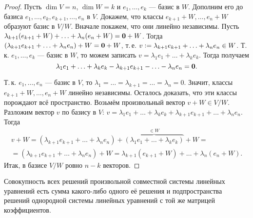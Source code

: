 \begin{proof}
    Пусть $\dim V = n$, $\dim W = k$ и $e_1, \ldots, e_k$ --- базис в $W$. Дополним его до базиса $e_1, \ldots, e_k, e_{k + 1}, \ldots, e_n$ в $V$. Докажем, что классы $e_{k + 1} + W, \ldots, e_n + W$ образуют базис в $V / W$. Вначале покажем, что они линейно независимы. Пусть $\lambda_{k + 1}(e_{k + 1} + W) + \ldots + \lambda_n(e_n + W) = \boldsymbol{0} + W$. Тогда $(\lambda_{k + 1}e_{k + 1} + \ldots + \lambda_ne_n) + W = \boldsymbol{0} + W$, т.\,е. $v \vcentcolon = \lambda_{k + 1}e_{k + 1} + \ldots + \lambda_ne_n \in W$. Т.\,к. $e_1, \ldots, e_k$ --- базис в $W$, то можем записать $v = \lambda_1e_1 + \ldots + \lambda_ke_k$. Тогда получаем
    \[
        \lambda_1e_1 + \ldots + \lambda_ke_k - \lambda_{k + 1}e_{k + 1} - \ldots - \lambda_ne_n = \boldsymbol{0}.
    \]

    Т.\,к. $e_1, \ldots, e_n$ --- базис в $V$, то $\lambda_1 = \ldots = \lambda_{k + 1} = \ldots = \lambda_n = 0$. Значит, классы $e_{k + 1} + W, \ldots, e_n + W$ линейно независимы. Осталось доказать, что эти классы порождают всё пространство. Возьмём произвольный вектор $v + W \in V / W$. Разложим вектор $v$ по базису в $V$: $v = \lambda_1e_1 + \ldots + \lambda_ke_k + \lambda_{k + 1}e_{k + 1} + \ldots + \lambda_ne_n$. Тогда
    \begin{multline*}
        v + W = (\lambda_{k + 1}e_{k + 1} + \ldots + \lambda_ne_n) + \overbrace{(\lambda_1e_1 + \ldots + \lambda_ke_k)}^{\in W} + W =\\ = (\lambda_{k + 1}e_{k + 1} + \ldots + \lambda_ne_n) + W = \lambda_{k + 1}(e_{k + 1} + W) + \ldots + \lambda_n(e_n + W).
    \end{multline*}
    Итак, в базисе $V / W$ ровно $n - k$ векторов.
\end{proof}

\begin{proposal}
    Совокупность всех решений произвольной совместной системы линейных уравнений есть сумма какого-либо одного её решения и подпространства решений однородной системы линейных уравнений с той же матрицей коэффициентов.
\end{proposal}

